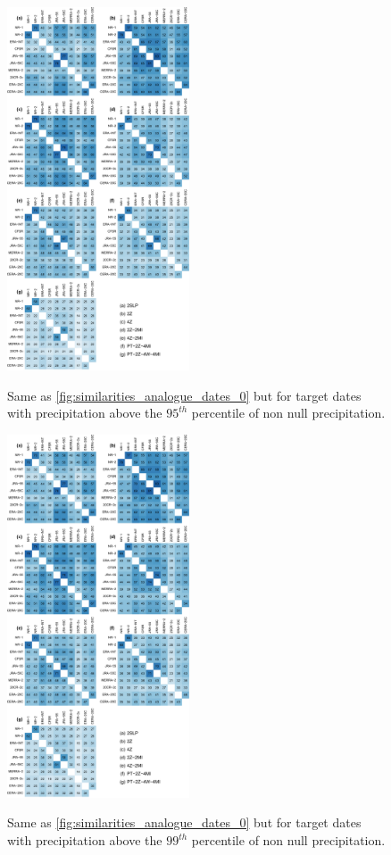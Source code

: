 \documentclass[twocolumn]{svjour3}       %
\begin{document}
	\begin{figure}
		\includegraphics[width=0.48\textwidth]{figure-supp-dates-thres-095.pdf}\\
		\caption{Same as \ref{fig:similarities_analogue_dates_0} but for target dates with precipitation above the $95^{th}$ percentile of non null precipitation.}
		\label{fig:similarities_analogue_dates_095}
	\end{figure}

	\begin{figure}
		\includegraphics[width=0.48\textwidth]{figure-supp-dates-thres-099.pdf}\\
		\caption{Same as \ref{fig:similarities_analogue_dates_0} but for target dates with precipitation above the $99^{th}$ percentile of non null precipitation.}
		\label{fig:similarities_analogue_dates_099}
	\end{figure}

	
	
\end{document}

